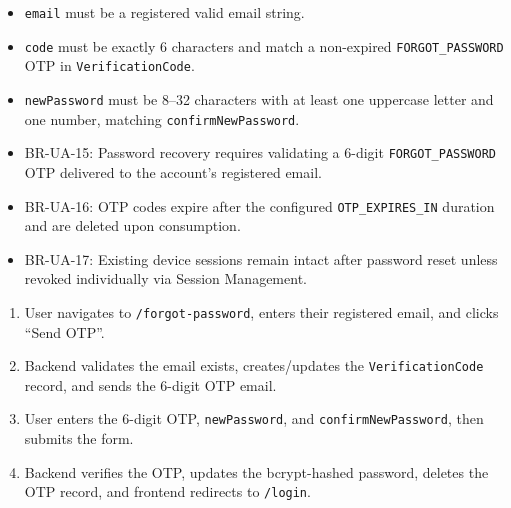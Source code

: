 \begin{itemize}[leftmargin=1.6em,topsep=3pt,itemsep=2pt,parsep=0pt,label=$\bullet$]
    \item \texttt{email} must be a registered valid email string.
    \item \texttt{code} must be exactly 6 characters and match a non-expired \texttt{FORGOT\_PASSWORD} OTP in \texttt{VerificationCode}.
    \item \texttt{newPassword} must be 8--32 characters with at least one uppercase letter and one number, matching \texttt{confirmNewPassword}.
\end{itemize}

\begin{itemize}[leftmargin=1.6em,topsep=3pt,itemsep=2pt,parsep=0pt,label=$\bullet$]\brrulelist
    \item BR-UA-15: Password recovery requires validating a 6-digit \texttt{FORGOT\_PASSWORD} OTP delivered to the account's registered email.
    \item BR-UA-16: OTP codes expire after the configured \texttt{OTP\_EXPIRES\_IN} duration and are deleted upon consumption.
    \item BR-UA-17: Existing device sessions remain intact after password reset unless revoked individually via Session Management.
\end{itemize}

\begin{enumerate}[leftmargin=1.8em,topsep=3pt,itemsep=2pt,parsep=0pt]
    \item User navigates to \texttt{/forgot-password}, enters their registered email, and clicks ``Send OTP''.
    \item Backend validates the email exists, creates/updates the \texttt{VerificationCode} record, and sends the 6-digit OTP email.
    \item User enters the 6-digit OTP, \texttt{newPassword}, and \texttt{confirmNewPassword}, then submits the form.
    \item Backend verifies the OTP, updates the bcrypt-hashed password, deletes the OTP record, and frontend redirects to \texttt{/login}.
\end{enumerate}

